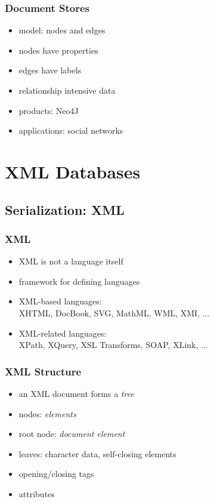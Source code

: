 \documentclass[dvipsnames]{beamer}
\theoremstyle{plain}
\begin{document}
\begin{frame}
  \frametitle{Document Stores}

  \begin{itemize}
    \item model: nodes and edges
    \item nodes have properties
    \item edges have labels
    \item relationship intensive data
    \item products: Neo4J
    \item applications: social networks
  \end{itemize}
\end{frame}

\section{XML Databases}

\subsection{Serialization: XML}

\lstset{language=XML}

\begin{frame}
  \frametitle{XML}

  \begin{itemize}
    \item XML is not a language itself
    \item framework for defining languages

    \medskip
    \item XML-based languages:\\
      XHTML, DocBook, SVG, MathML, WML, XMI, ...

    \smallskip
    \item XML-related languages:\\
      XPath, XQuery, XSL Transforms, SOAP, XLink, ...
  \end{itemize}
\end{frame}

\begin{frame}
  \frametitle{XML Structure}

  \begin{itemize}
    \item an XML document forms a \emph{tree}

    \item nodes: \emph{elements}
    \item root node: \emph{document element}
    \item leaves: character data, self-closing elements

    \pause
    \medskip
    \item opening/closing tags
    \item attributes
  \end{itemize}
\end{frame}
\end{document}
